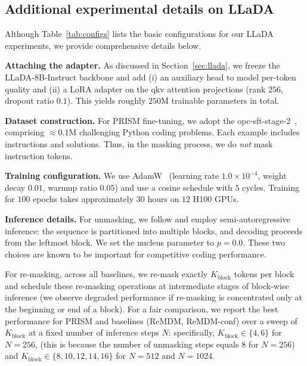 \subsection{Additional experimental details on LLaDA}
\label{appendix:llada}
Although Table~\ref{tab:configs} lists the basic configurations for our LLaDA experiments, we provide comprehensive details below.

\textbf{Attaching the adapter.}
As discussed in Section~\ref{sec:llada}, we freeze the LLaDA-8B-Instruct backbone and add (i) an auxiliary head to model per-token quality and (ii) a LoRA adapter on the qkv attention projections (rank $256$, dropout ratio $0.1$). This yields roughly $250$M trainable parameters in total.

\textbf{Dataset construction.}
For PRISM fine-tuning, we adopt the opc-sft-stage-2~\citep{Huang2024OpenCoderTO}, comprising $\approx 0.1$M challenging Python coding problems. Each example includes instructions and solutions. Thus, in the masking process, we do \emph{not} mask instruction tokens.

\textbf{Training configuration.}
We use AdamW~\citep{loshchilov2017decoupled} (learning rate \(1.0\times 10^{-4}\), weight decay \(0.01\), warmup ratio \(0.05\)) and use a cosine schedule with \(5\) cycles. Training for \(100\) epochs takes approximately \(30\) hours on \(12\) H100 GPUs.

\textbf{Inference details.}
For unmasking, we follow \citet{nie2025large} and employ semi-autoregressive inference: the sequence is partitioned into multiple blocks, and decoding proceeds from the leftmost block. We set the nucleus parameter to \(p=0.0\). These two choices are known to be important for competitive coding performance. 

For re-masking, across all baselines, we re-mask exactly $K_{\text{block}}$ tokens per block and schedule these re-masking operations at intermediate stages of block-wise inference (we observe degraded performance if re-masking is concentrated only at the beginning or end of a block). For a fair comparison, we report the best performance for PRISM and baselines (ReMDM, ReMDM-conf) over a sweep of $K_{\text{block}}$ at a fixed number of inference steps $N$: specifically,
\(K_{\text{block}}\in\{4,6\}\) for \(N=256\), (this is because the number of unmasking steps equals $8$ for $N=256$) and \(K_{\text{block}}\in\{8,10,12,14,16\}\) for \(N=512\) and \(N=1024\).
